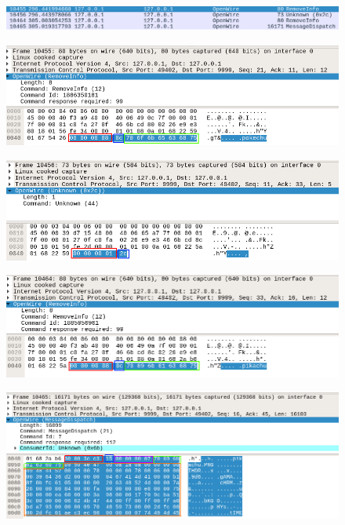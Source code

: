 \documentclass[12pt]{article}
\begin{document}
\begin{figure}[H]
  \centering
  \includegraphics[width=\textwidth]{08}
  \caption{}
\end{figure}

\begin{figure}[H]
  \centering
  \includegraphics[width=\textwidth]{09}
  \caption{}
\end{figure}

\begin{figure}[H]
  \centering
  \includegraphics[width=\textwidth]{10}
  \caption{}
\end{figure}

\begin{figure}[H]
  \centering
  \includegraphics[width=\textwidth]{11}
  \caption{}
\end{figure}

\begin{figure}[H]
  \centering
  \includegraphics[width=\textwidth]{13}
  \caption{}
\end{figure}
\end{document}
